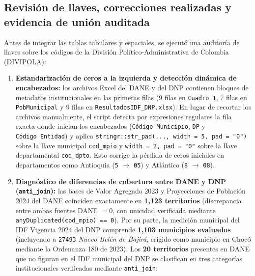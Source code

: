 \documentclass[
  10pt,
  letterpaper,
  DIV=11,
  numbers=noendperiod]{scrartcl}
\providecommand{\tightlist}{%
  \setlength{\itemsep}{0pt}\setlength{\parskip}{0pt}}
\begin{document}
\subsection{Revisión de llaves, correcciones realizadas y evidencia de
unión
auditada}\label{revisiuxf3n-de-llaves-correcciones-realizadas-y-evidencia-de-uniuxf3n-auditada}

Antes de integrar las tablas tabulares y espaciales, se ejecutó una
auditoría de llaves sobre los códigos de la División
Político-Administrativa de Colombia (DIVIPOLA):

\begin{enumerate}
\def\labelenumi{\arabic{enumi}.}
\tightlist
\item
  \textbf{Estandarización de ceros a la izquierda y detección dinámica
  de encabezados:} los archivos Excel del DANE y del DNP contienen
  bloques de metadatos institucionales en las primeras filas (9 filas en
  \texttt{Cuadro\ 1}, 7 filas en \texttt{PobMunicipal} y 9 filas en
  \texttt{ResultadosIDF\_DNP.xlsx}). En lugar de recortar los archivos
  manualmente, el script detecta por expresiones regulares la fila
  exacta donde inician los encabezados (\texttt{Código\ Municipio},
  \texttt{DP} y \texttt{Código\ Entidad}) y aplica
  \texttt{stringr::str\_pad(...,\ width\ =\ 5,\ pad\ =\ "0")} sobre la
  llave municipal \texttt{cod\_mpio} y
  \texttt{width\ =\ 2,\ pad\ =\ "0"} sobre la llave departamental
  \texttt{cod\_dpto}. Esto corrige la pérdida de ceros iniciales en
  departamentos como Antioquia (\texttt{5} \(\to\) \texttt{05}) y
  Atlántico (\texttt{8} \(\to\) \texttt{08}).
\item
  \textbf{Diagnóstico de diferencias de cobertura entre DANE y DNP
  (\texttt{anti\_join}):} las bases de Valor Agregado 2023 y
  Proyecciones de Población 2024 del DANE coinciden exactamente en
  \textbf{1,123 territorios} (discrepancia entre ambas fuentes DANE
  \(= 0\), con unicidad verificada mediante
  \texttt{anyDuplicated(cod\_mpio)\ ==\ 0}). Por su parte, la medición
  municipal del IDF Vigencia 2024 del DNP comprende \textbf{1,103
  municipios evaluados} (incluyendo a \texttt{27493} \emph{Nuevo Belén
  de Bajirá}, erigido como municipio en Chocó mediante la Ordenanza 180
  de 2023). Los \textbf{20 territorios} presentes en DANE que no figuran
  en el IDF municipal del DNP se clasifican en tres categorías
  institucionales verificadas mediante \texttt{anti\_join}:


\end{enumerate}
\end{document}
